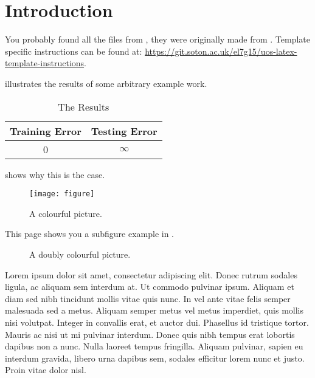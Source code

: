 \chapter{Introduction} \label{Chapter:Introduction}
You probably found all the files from \cite{Longman:2019:templ},
they were originally made from \cite{Gunn:2001:pdflatex}.
Template specific instructions can be found at:
\url{https://git.soton.ac.uk/el7g15/uos-latex-template-instructions}.

 illustrates the results of some arbitrary example work.
\begin{table}[!htb]
  \centering
  \begin{tabular}{cc}
  \toprule
  \textbf{Training Error} & \textbf{Testing Error}\\
  \midrule
  0 & $\infty$\\
  \bottomrule
  \end{tabular}
  \caption{The Results}
  \label{Table:tabex}
\end{table}

 shows why this is the case.
\begin{figure}[!htb]
  \centering
  \texttt{[image: figure]}
  \caption{A colourful picture.}
  \label{Figure:figex}
\end{figure}

This page shows you a subfigure example in .
\begin{figure}[!htb]
  \centering
  \caption{A doubly colourful picture.}
  \label{Figure:figsubex}
\end{figure}
Lorem ipsum dolor sit amet, consectetur adipiscing elit. Donec rutrum sodales ligula, ac aliquam sem interdum at. Ut commodo pulvinar ipsum. Aliquam et diam sed nibh tincidunt mollis vitae quis nunc. In vel ante vitae felis semper malesuada sed a metus. Aliquam semper metus vel metus imperdiet, quis mollis nisi volutpat. Integer in convallis erat, et auctor dui. Phasellus id tristique tortor. Mauris ac nisi ut mi pulvinar interdum. Donec quis nibh tempus erat lobortis dapibus non a nunc. Nulla laoreet tempus fringilla. Aliquam pulvinar, sapien eu interdum gravida, libero urna dapibus sem, sodales efficitur lorem nunc et justo. Proin vitae dolor nisl.

